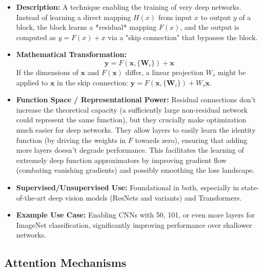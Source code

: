 \documentclass{article}
\newcommand{\bW}{\bm{W}}
\begin{document}
\begin{itemize}
    \item \textbf{Description:} A technique enabling the training of very deep networks. Instead of learning a direct mapping $H(x)$ from input $x$ to output $y$ of a block, the block learns a *residual* mapping $F(x)$, and the output is computed as $y = F(x) + x$ via a "skip connection" that bypasses the block.
    \item \textbf{Mathematical Transformation:}
        \begin{equation}
            \mathbf{y} = F(\mathbf{x}, \{\bW_i\}) + \mathbf{x}
        \end{equation}
        If the dimensions of $\mathbf{x}$ and $F(\mathbf{x})$ differ, a linear projection $W_s$ might be applied to $\mathbf{x}$ in the skip connection: $\mathbf{y} = F(\mathbf{x}, \{\bW_i\}) + W_s\mathbf{x}$.
    \item \textbf{Function Space / Representational Power:} Residual connections don't increase the theoretical capacity (a sufficiently large non-residual network could represent the same function), but they crucially make optimization much easier for deep networks. They allow layers to easily learn the identity function (by driving the weights in $F$ towards zero), ensuring that adding more layers doesn't degrade performance. This facilitates the learning of extremely deep function approximators by improving gradient flow (combating vanishing gradients) and possibly smoothing the loss landscape.
    \item \textbf{Supervised/Unsupervised Use:} Foundational in both, especially in state-of-the-art deep vision models (ResNets and variants) and Transformers.
    \item \textbf{Example Use Case:} Enabling CNNs with 50, 101, or even more layers for ImageNet classification, significantly improving performance over shallower networks.
\end{itemize}

\subsection{Attention Mechanisms}
\end{document}
